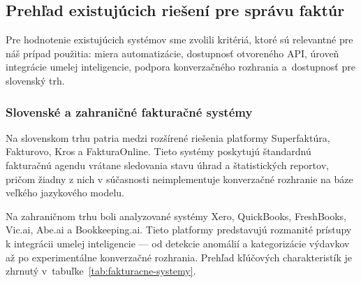 \subsection{Prehľad existujúcich riešení pre správu faktúr}

Pre hodnotenie existujúcich systémov sme zvolili kritériá, ktoré sú relevantné pre
náš prípad použitia: miera automatizácie, dostupnosť otvoreného API, úroveň
integrácie umelej inteligencie, podpora konverzačného rozhrania a~dostupnosť pre slovenský
trh.

\subsubsection{Slovenské a zahraničné fakturačné systémy}

Na slovenskom trhu patria medzi rozšírené riešenia platformy Superfaktúra, Fakturovo,
Kros a FakturaOnline. Tieto systémy poskytujú štandardnú fakturačnú agendu vrátane
sledovania stavu úhrad a štatistických reportov, pričom žiadny z nich v
súčasnosti neimplementuje konverzačné rozhranie na báze veľkého jazykového
modelu.

Na zahraničnom trhu boli analyzované systémy Xero, QuickBooks, FreshBooks, Vic.ai,
Abe.ai a Bookkeeping.ai. Tieto platformy predstavujú rozmanité prístupy k integrácii
umelej inteligencie — od detekcie anomálií a kategorizácie výdavkov až po experimentálne
konverzačné rozhrania. Prehľad kľúčových charakteristík je zhrnutý v~tabuľke~\ref{tab:fakturacne-systemy}.

